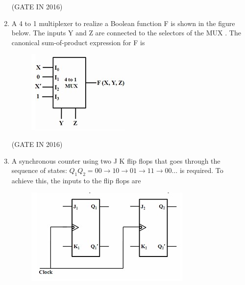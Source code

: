 \documentclass[journal,12pt,onecolumn]{IEEEtran}
\theoremstyle{remark}
\begin{document}
\begin{enumerate}
\hfill{(GATE IN 2016)}

\item A 4 to 1 multiplexer to realize a Boolean function F  is shown in the figure below. The inputs Y and Z are connected to the selectors of the MUX . The canonical sum-of-product expression for F  is
\begin{figure}[H]
\centering
\includegraphics[width=0.4\columnwidth]{figs/z23.jpg}
\caption*{}
\label{fig:z23}
\end{figure}

\hfill{(GATE IN 2016)}
\begin{enumerate}
\end{enumerate}

\item A synchronous counter using two J K flip flops that goes through the sequence of states: $Q_1 Q_2 = 00 \to 10 \to 01 \to 11 \to 00 \dots$ is required. To achieve this, the inputs to the flip flops are
\begin{figure}[H]
\centering
\includegraphics[width=0.6\columnwidth]{figs/z24.jpg}
\caption*{}
\label{fig:z24}
\end{figure}


\end{enumerate}
\end{document}
